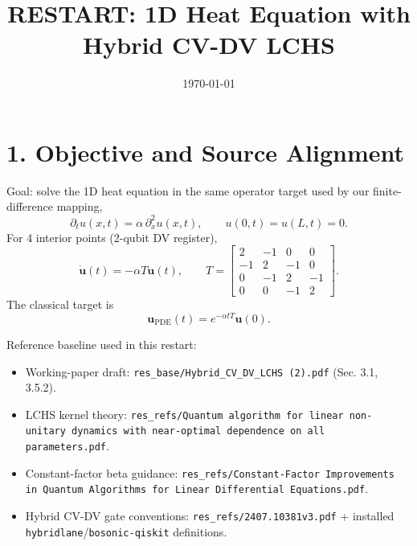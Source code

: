 \documentclass[11pt]{article}
\title{RESTART: 1D Heat Equation with Hybrid CV-DV LCHS}
\date{\today}
\begin{document}
\maketitle

\section*{1. Objective and Source Alignment}
Goal: solve the 1D heat equation in the same operator target used by our finite-difference mapping,
\begin{equation}
\partial_t u(x,t)=\alpha\,\partial_x^2 u(x,t),\qquad u(0,t)=u(L,t)=0.
\end{equation}
For 4 interior points (2-qubit DV register),
\begin{equation}
\dot{\bm u}(t)=-\alpha T\bm u(t),\qquad
T=\begin{bmatrix}
2&-1&0&0\\
-1&2&-1&0\\
0&-1&2&-1\\
0&0&-1&2
\end{bmatrix}.
\end{equation}
The classical target is
\begin{equation}
\bm u_{\mathrm{PDE}}(t)=e^{-\alpha tT}\bm u(0).
\end{equation}

Reference baseline used in this restart:
\begin{itemize}
\item Working-paper draft: \texttt{res\_base/Hybrid\_CV\_DV\_LCHS (2).pdf} (Sec. 3.1, 3.5.2).
\item LCHS kernel theory: \texttt{res\_refs/Quantum algorithm for linear non-unitary dynamics with near-optimal dependence on all parameters.pdf}.
\item Constant-factor beta guidance: \texttt{res\_refs/Constant-Factor Improvements in Quantum Algorithms for Linear Differential Equations.pdf}.
\item Hybrid CV-DV gate conventions: \texttt{res\_refs/2407.10381v3.pdf} + installed \texttt{hybridlane}/\texttt{bosonic-qiskit} definitions.
\end{itemize}
\end{document}
